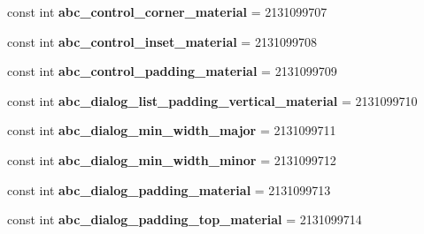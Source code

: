 \begin{DoxyCompactItemize}
\item 
\hypertarget{classClient_1_1Droid_1_1Resource_1_1Dimension_a81aa52a8204c14cfccf6f6fd7e89036f}{}const int {\bfseries abc\+\_\+control\+\_\+corner\+\_\+material} = 2131099707\label{classClient_1_1Droid_1_1Resource_1_1Dimension_a81aa52a8204c14cfccf6f6fd7e89036f}

\item 
\hypertarget{classClient_1_1Droid_1_1Resource_1_1Dimension_af04520713863f74a24eb8412d470c527}{}const int {\bfseries abc\+\_\+control\+\_\+inset\+\_\+material} = 2131099708\label{classClient_1_1Droid_1_1Resource_1_1Dimension_af04520713863f74a24eb8412d470c527}

\item 
\hypertarget{classClient_1_1Droid_1_1Resource_1_1Dimension_a18b11eec5d9d7035083de5bcc1e28a66}{}const int {\bfseries abc\+\_\+control\+\_\+padding\+\_\+material} = 2131099709\label{classClient_1_1Droid_1_1Resource_1_1Dimension_a18b11eec5d9d7035083de5bcc1e28a66}

\item 
\hypertarget{classClient_1_1Droid_1_1Resource_1_1Dimension_a10cc31a2bb300ca2e1fade200299d0f5}{}const int {\bfseries abc\+\_\+dialog\+\_\+list\+\_\+padding\+\_\+vertical\+\_\+material} = 2131099710\label{classClient_1_1Droid_1_1Resource_1_1Dimension_a10cc31a2bb300ca2e1fade200299d0f5}

\item 
\hypertarget{classClient_1_1Droid_1_1Resource_1_1Dimension_a5c6d7ba8f442094a9a66361673771295}{}const int {\bfseries abc\+\_\+dialog\+\_\+min\+\_\+width\+\_\+major} = 2131099711\label{classClient_1_1Droid_1_1Resource_1_1Dimension_a5c6d7ba8f442094a9a66361673771295}

\item 
\hypertarget{classClient_1_1Droid_1_1Resource_1_1Dimension_a9cd306f1198ffca7bcda774b831409bb}{}const int {\bfseries abc\+\_\+dialog\+\_\+min\+\_\+width\+\_\+minor} = 2131099712\label{classClient_1_1Droid_1_1Resource_1_1Dimension_a9cd306f1198ffca7bcda774b831409bb}

\item 
\hypertarget{classClient_1_1Droid_1_1Resource_1_1Dimension_a0e975ae1b7f8a1c081e292806656c15c}{}const int {\bfseries abc\+\_\+dialog\+\_\+padding\+\_\+material} = 2131099713\label{classClient_1_1Droid_1_1Resource_1_1Dimension_a0e975ae1b7f8a1c081e292806656c15c}

\item 
\hypertarget{classClient_1_1Droid_1_1Resource_1_1Dimension_a2e9aeda343760c9663f83f79116a44e9}{}const int {\bfseries abc\+\_\+dialog\+\_\+padding\+\_\+top\+\_\+material} = 2131099714\label{classClient_1_1Droid_1_1Resource_1_1Dimension_a2e9aeda343760c9663f83f79116a44e9}


\end{DoxyCompactItemize}

